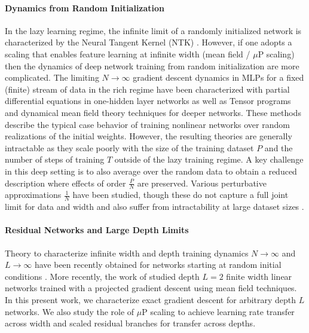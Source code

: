 \paragraph{Dynamics from Random Initialization} In the lazy learning regime, the infinite limit of a randomly initialized network is characterized by the Neural Tangent Kernel (NTK) \cite{jacot2018neural, lee2019wide}. However, if one adopts a scaling that enables feature learning at infinite width (mean field / $\mu$P scaling) then the dynamics of deep network training from random initialization are more complicated. The limiting $N \to \infty$ gradient descent dynamics in MLPs for a fixed (finite) stream of data in the rich regime have been characterized with partial differential equations in one-hidden layer networks \cite{mei2019mean, rotskoff2022trainability}  as well as Tensor programs \cite{yang2021tensor} and dynamical mean field theory \cite{bordelon2022self} techniques for deeper networks. These methods describe the typical case behavior of training nonlinear networks over random realizations of the initial weights. However, the resulting theories are generally intractable as they scale poorly with the size of the training dataset $P$ and the number of steps of training $T$ outside of the lazy training regime. A key challenge in this deep setting is to also average over the random data to obtain a reduced description where effects of order $\frac{ P }{ N }$ are preserved. Various perturbative approximations $\frac{1}{N}$ have been studied, though these do not capture a full joint limit for data and width and also suffer from intractability at large dataset sizes \cite{dyerasymptotics, roberts2022principles, hanin2019finite, bordelon2023dynamics}.

\vspace{-8pt}
\paragraph{Residual Networks and Large Depth Limits} Theory to characterize infinite width and depth training dynamics $N \to \infty$ and $L \to \infty$ have been recently obtained for networks starting at random initial conditions \citet{bordelon2024depthwise, yang2023tensor}.  More recently, the work of 
\citet{bordelon2024featurelearningimproveneural} studied depth $L = 2$ finite width linear networks trained with a projected gradient descent using mean field techniques. In this present work, we characterize exact gradient descent for arbitrary depth $L$ networks. We also study the role of $\mu$P scaling to achieve learning rate transfer across width and scaled residual branches \cite{bordelon2024dynamical, yang2023tensor} for transfer across depths. 

